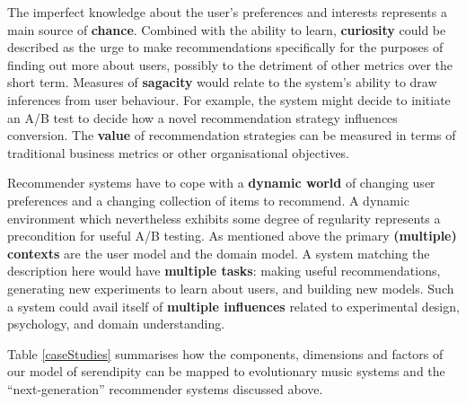 The imperfect knowledge about the user's preferences and interests represents a main source of \textbf{chance}. Combined with the ability to learn, \textbf{curiosity} could be described as the urge to make recommendations specifically for the purposes of finding out more about users, possibly to the detriment of other metrics over the short term. Measures of \textbf{sagacity} would relate to the system's ability to draw inferences from user behaviour.  For example, the system might decide to initiate an A/B test to decide how a novel recommendation strategy influences conversion.  The \textbf{value} of recommendation strategies can be measured in terms of traditional business metrics or other organisational objectives.

Recommender systems have to cope with a \textbf{dynamic world} of changing user preferences and a changing collection of items to recommend.  A dynamic environment which nevertheless exhibits some degree of regularity represents a precondition for useful A/B testing.  As mentioned above the primary \textbf{(multiple) contexts} are the user model and the domain model. A system matching the description here would have \textbf{multiple tasks}: making useful recommendations, generating new experiments to learn about users, and building new models. Such a system could avail itself of \textbf{multiple influences} related to
experimental design, psychology, and domain understanding.

Table \ref{caseStudies} summarises how the components, dimensions and
factors of our model of serendipity can be mapped to evolutionary music systems and the ``next-generation'' recommender systems discussed above.





